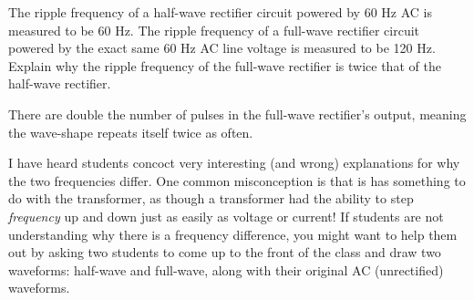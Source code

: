 

The ripple frequency of a half-wave rectifier circuit powered by 60 Hz AC is measured to be 60 Hz.  The ripple frequency of a full-wave rectifier circuit powered by the exact same 60 Hz AC line voltage is measured to be 120 Hz.  Explain why the ripple frequency of the full-wave rectifier is twice that of the half-wave rectifier.







There are double the number of pulses in the full-wave rectifier's output, meaning the wave-shape repeats itself twice as often.







I have heard students concoct very interesting (and wrong) explanations for why the two frequencies differ.  One common misconception is that is has something to do with the transformer, as though a transformer had the ability to step {\it frequency} up and down just as easily as voltage or current!  If students are not understanding why there is a frequency difference, you might want to help them out by asking two students to come up to the front of the class and draw two waveforms: half-wave and full-wave, along with their original AC (unrectified) waveforms.




